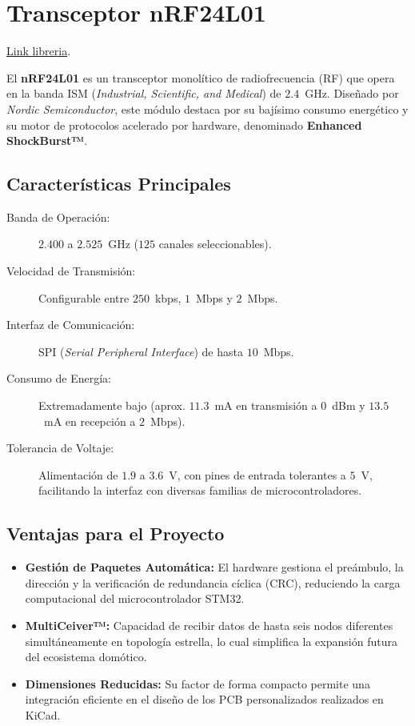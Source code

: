 \documentclass[12pt,a4paper]{article}
\begin{document}
\section{Transceptor nRF24L01}

\href{https://github.com/matutecno/PdM_workspace_Matias_Morales/blob/36632c7629ba2d8375b50d48365e32dbffeaf255/TPF/Personal_libs/NRF24L01/Src/nrf24l01.c}{Link libreria}.

El \textbf{nRF24L01} es un transceptor monolítico de radiofrecuencia (RF) que opera en la banda ISM (\textit{Industrial, Scientific, and Medical}) de $2.4$~GHz. Diseñado por \textit{Nordic Semiconductor}, este módulo destaca por su bajísimo consumo energético y su motor de protocolos acelerado por hardware, denominado \textbf{Enhanced ShockBurst™}.




\subsection{Características Principales}

\begin{description}
    \item[Banda de Operación:] $2.400$ a $2.525$~GHz ($125$ canales seleccionables).
    \item[Velocidad de Transmisión:] Configurable entre $250$~kbps, $1$~Mbps y $2$~Mbps.
    \item[Interfaz de Comunicación:] SPI (\textit{Serial Peripheral Interface}) de hasta $10$~Mbps.
    \item[Consumo de Energía:] Extremadamente bajo (aprox. $11.3$~mA en transmisión a $0$~dBm y $13.5$~mA en recepción a $2$~Mbps).
    \item[Tolerancia de Voltaje:] Alimentación de $1.9$ a $3.6$~V, con pines de entrada tolerantes a $5$~V, facilitando la interfaz con diversas familias de microcontroladores.
\end{description}

\subsection{Ventajas para el Proyecto}

\begin{itemize}
    \item \textbf{Gestión de Paquetes Automática:} El hardware gestiona el preámbulo, la dirección y la verificación de redundancia cíclica (CRC), reduciendo la carga computacional del microcontrolador STM32.
    \item \textbf{MultiCeiver™:} Capacidad de recibir datos de hasta seis nodos diferentes simultáneamente en topología estrella, lo cual simplifica la expansión futura del ecosistema domótico.
    \item \textbf{Dimensiones Reducidas:} Su factor de forma compacto permite una integración eficiente en el diseño de los PCB personalizados realizados en KiCad.
\end{itemize}
\end{document}
